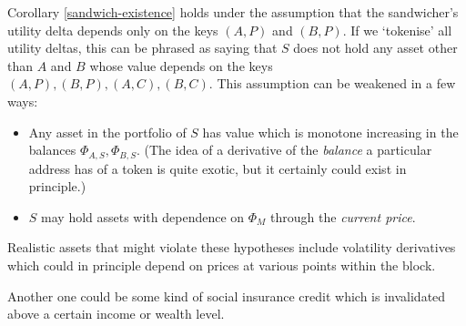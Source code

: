 \documentclass[a4paper,11pt]{article}
\begin{document}
\begin{remark} \label{exotic-derivative}

  Corollary \ref{sandwich-existence} holds under the assumption that the sandwicher's utility delta depends only on the keys $(A,P)$ and $(B,P)$.
  If we `tokenise' all utility deltas, this can be phrased as saying that $S$ does not hold any asset other than $A$ and $B$ whose value depends on the keys $(A,P),(B,P),(A,C),(B,C)$.
  This assumption can be weakened in a few ways:
  \begin{itemize}
    \item 
      Any asset in the portfolio of $S$ has value which is monotone increasing in the balances $\Phi_{A,S},\Phi_{B,S}$.
      (The idea of a derivative of the \emph{balance} a particular address has of a token is quite exotic, but it certainly could exist in principle.)
    \item 
      $S$ may hold assets with dependence on $\Phi_M$ through the \emph{current price}.
  \end{itemize}
  Realistic assets that might violate these hypotheses include volatility derivatives which could in principle depend on prices at various points within the block.
  
  Another one could be some kind of social insurance credit which is invalidated above a certain income or wealth level.
  
\end{remark}

\nocite{angeris2019analysis}
\nocite{angeris2020improved}

\printbibliography
\end{document}
